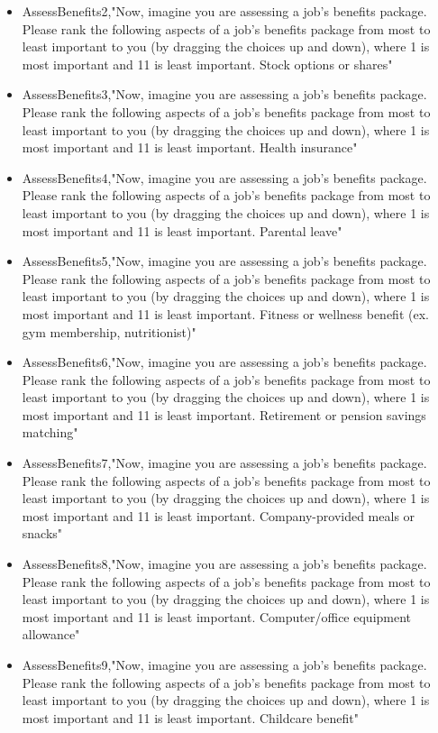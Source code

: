 \begin{appendices}
\begin{itemize}
        \item AssessBenefits2,"Now, imagine you are assessing a job's benefits package. Please rank the following aspects of a job's benefits package from most to least important to you (by dragging the choices up and down), where 1 is most important and 11 is least important. Stock options or shares"
        \item AssessBenefits3,"Now, imagine you are assessing a job's benefits package. Please rank the following aspects of a job's benefits package from most to least important to you (by dragging the choices up and down), where 1 is most important and 11 is least important. Health insurance"
        \item AssessBenefits4,"Now, imagine you are assessing a job's benefits package. Please rank the following aspects of a job's benefits package from most to least important to you (by dragging the choices up and down), where 1 is most important and 11 is least important. Parental leave"
        \item AssessBenefits5,"Now, imagine you are assessing a job's benefits package. Please rank the following aspects of a job's benefits package from most to least important to you (by dragging the choices up and down), where 1 is most important and 11 is least important. Fitness or wellness benefit (ex. gym membership, nutritionist)"
        \item AssessBenefits6,"Now, imagine you are assessing a job's benefits package. Please rank the following aspects of a job's benefits package from most to least important to you (by dragging the choices up and down), where 1 is most important and 11 is least important. Retirement or pension savings matching"
        \item AssessBenefits7,"Now, imagine you are assessing a job's benefits package. Please rank the following aspects of a job's benefits package from most to least important to you (by dragging the choices up and down), where 1 is most important and 11 is least important. Company-provided meals or snacks"
        \item AssessBenefits8,"Now, imagine you are assessing a job's benefits package. Please rank the following aspects of a job's benefits package from most to least important to you (by dragging the choices up and down), where 1 is most important and 11 is least important. Computer/office equipment allowance"
        \item AssessBenefits9,"Now, imagine you are assessing a job's benefits package. Please rank the following aspects of a job's benefits package from most to least important to you (by dragging the choices up and down), where 1 is most important and 11 is least important. Childcare benefit"

\end{itemize}
\end{appendices}
